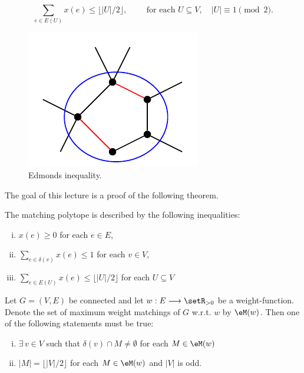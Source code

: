 \begin{equation}
  \label{po:eq:11}
  \sum_{e \in E(U)} x(e) \leq\lfloor|U|/2\rfloor,\quad \quad \text{ for each } U\subseteq V,
  \quad |U| \equiv 1 \pmod{2}. 
\end{equation}


\begin{figure}[htbp]    
  \begin{center}
 \includegraphics{figures/PicPolyhedra4.pdf}
\end{center}
\caption{Edmonds inequality.}
  \label{po:fig:edmonds}
\end{figure}


The goal of this lecture is a proof of the following theorem. 

\begin{theorem}[Edmonds 65]
\label{po:thr:18}
  The matching polytope is described by the following inequalities:
  \begin{enumerate}[i)]
  \item $x(e) \geq0$ for each $e \in E$,
  \item $\sum_{e \in \delta(v)} x(e) \leq 1$ for each $v \in V$,
  \item $\sum_{e \in E(U)} x(e) \leq \lfloor |U|  /2 \rfloor$ for each $U\subseteq V$
  \end{enumerate}
\end{theorem}


\begin{lemma}
\label{po:lem:11}
  Let $G=(V,E)$ be connected and 
  let $w:E\longrightarrow\setR_{>0}$ be a weight-function.  Denote the set of maximum
  weight matchings of $G$ w.r.t. $w$ by $\eM(w)$. Then one of the following statements
  must be true:
  \begin{enumerate}[i)]
  \item $\exists\,v \in V$ such that $\delta(v) \cap M \neq \emptyset$ for each $M \in \eM(w)$
  \item $|M| =   \lfloor|V| /2\rfloor$ for each $M \in \eM(w)$ and $|V|$ is odd.
  \end{enumerate}
\end{lemma}



